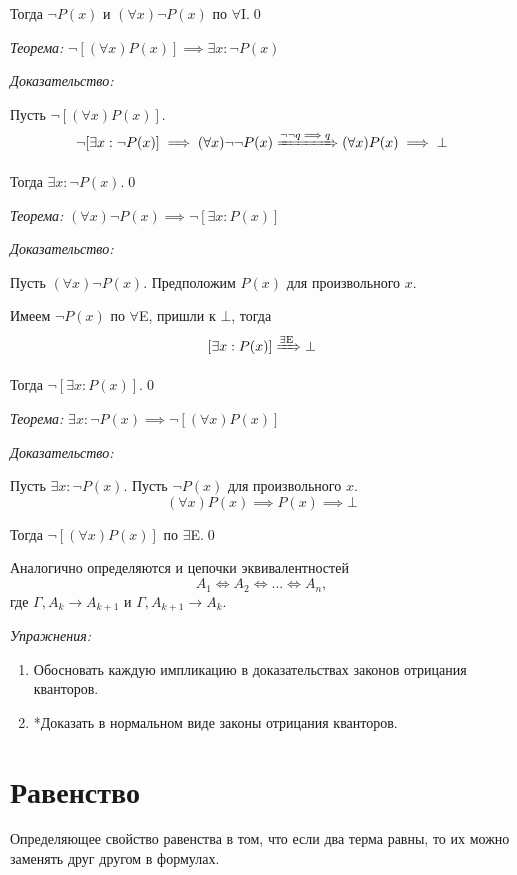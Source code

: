 Тогда $\lnot P(x)$ и $(\forall x)\lnot P(x)$
по $\forall$I.\qed

\pagebreak
{\it Теорема:} $\lnot[(\forall x)P(x)]\implies \exists x:\lnot P(x)$

{\it Доказательство:}

Пусть $\lnot[(\forall x)P(x)]$.
\[
	\lnot[\exists x:\lnot P(x)]\implies (\forall x)\lnot\lnot P(x)
	\xRightarrow{\lnot\lnot q\implies q} (\forall x)P(x)\implies\bot
\]

Тогда $\exists x:\lnot P(x)$.\qed

\vspace{1em}
{\it Теорема:} $(\forall x)\lnot P(x)\implies \lnot[\exists x:P(x)]$

{\it Доказательство:}

Пусть $(\forall x)\lnot P(x)$. Предположим $P(x)$ для произвольного $x$.

Имеем $\lnot P(x)$ по $\forall$E, пришли к $\bot$, тогда
\[
	[\exists x:P(x)]\xRightarrow{\text{$\exists$E}}\bot
\]

Тогда $\lnot[\exists x:P(x)]$.\qed

\vspace{1em}
{\it Теорема:} $\exists x:\lnot P(x)\implies\lnot[(\forall x)P(x)]$

{\it Доказательство:}

Пусть $\exists x:\lnot P(x)$. Пусть $\lnot P(x)$ для произвольного $x$.
\[
	(\forall x)P(x)\implies P(x)\implies \bot
\]

Тогда $\lnot[(\forall x)P(x)]$ по $\exists$E.\qed

\vspace{1em}
Аналогично определяются и цепочки эквивалентностей
\[
	A_1\iff A_2\iff ...\iff A_{n},
\]
где $\Gamma,A_{k}\to A_{k+1}$ и $\Gamma,A_{k+1}\to A_{k}$.

\vspace{1em}
{\it Упражнения:}
\begin{enumerate}
	\item{}Обосновать каждую импликацию в доказательствах законов отрицания кванторов.
	\item{}*Доказать в нормальном виде законы отрицания кванторов.
\end{enumerate}

\section{Равенство}

Определяющее свойство равенства в том, что если два терма равны, то их можно
заменять друг другом в формулах.

